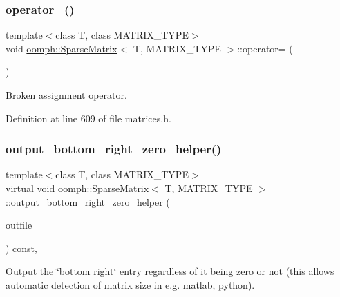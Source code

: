 \subsubsection{\texorpdfstring{operator=()}{operator=()}}
{\footnotesize\ttfamily template$<$class T, class M\+A\+T\+R\+I\+X\+\_\+\+T\+Y\+PE$>$ \\
void \hyperlink{classoomph_1_1SparseMatrix}{oomph\+::\+Sparse\+Matrix}$<$ T, M\+A\+T\+R\+I\+X\+\_\+\+T\+Y\+PE $>$\+::operator= (\begin{DoxyParamCaption}\item[{const \hyperlink{classoomph_1_1SparseMatrix}{Sparse\+Matrix}$<$ T, M\+A\+T\+R\+I\+X\+\_\+\+T\+Y\+PE $>$ \&}]{ }\end{DoxyParamCaption})\hspace{0.3cm}{\ttfamily [inline]}}



Broken assignment operator. 



Definition at line 609 of file matrices.\+h.

\mbox{\label{classoomph_1_1SparseMatrix_a4c638f36db786e159565e1f890402ed2}} 
\subsubsection{\texorpdfstring{output\+\_\+bottom\+\_\+right\+\_\+zero\+\_\+helper()}{output\_bottom\_right\_zero\_helper()}}
{\footnotesize\ttfamily template$<$class T, class M\+A\+T\+R\+I\+X\+\_\+\+T\+Y\+PE$>$ \\
virtual void \hyperlink{classoomph_1_1SparseMatrix}{oomph\+::\+Sparse\+Matrix}$<$ T, M\+A\+T\+R\+I\+X\+\_\+\+T\+Y\+PE $>$\+::output\+\_\+bottom\+\_\+right\+\_\+zero\+\_\+helper (\begin{DoxyParamCaption}\item[{std\+::ostream \&}]{outfile }\end{DoxyParamCaption}) const\hspace{0.3cm}{\ttfamily [inline]}, {\ttfamily [virtual]}}



Output the \char`\"{}bottom right\char`\"{} entry regardless of it being zero or not (this allows automatic detection of matrix size in e.\+g. matlab, python). 



